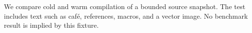 We compare cold and warm compilation of a bounded source snapshot.
The test includes text such as caf\'e, references, macros, and a vector image.
No benchmark result is implied by this fixture.
